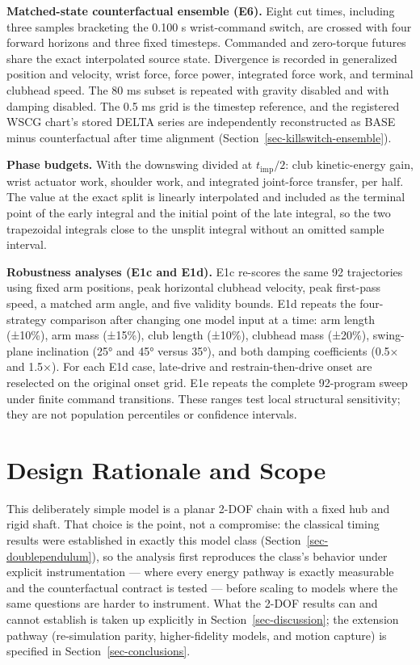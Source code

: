 \documentclass[
  letterpaper,
]{report}
\begin{document}
\textbf{Matched-state counterfactual ensemble (E6).} Eight cut times,
including three samples bracketing the 0.100 s wrist-command switch, are
crossed with four forward horizons and three fixed timesteps. Commanded
and zero-torque futures share the exact interpolated source state.
Divergence is recorded in generalized position and velocity, wrist
force, force power, integrated force work, and terminal clubhead speed.
The 80 ms subset is repeated with gravity disabled and with damping
disabled. The 0.5 ms grid is the timestep reference, and the registered
WSCG chart's stored DELTA series are independently reconstructed as BASE
minus counterfactual after time alignment
(Section~\ref{sec-killswitch-ensemble}).

\textbf{Phase budgets.} With the downswing divided at
\(t_{\mathrm{imp}}/2\): club kinetic-energy gain, wrist actuator work,
shoulder work, and integrated joint-force transfer, per half. The value
at the exact split is linearly interpolated and included as the terminal
point of the early integral and the initial point of the late integral,
so the two trapezoidal integrals close to the unsplit integral without
an omitted sample interval.

\textbf{Robustness analyses (E1c and E1d).} E1c re-scores the same 92
trajectories using fixed arm positions, peak horizontal clubhead
velocity, peak first-pass speed, a matched arm angle, and five validity
bounds. E1d repeats the four-strategy comparison after changing one
model input at a time: arm length (±10\%), arm mass (±15\%), club length
(±10\%), clubhead mass (±20\%), swing-plane inclination (25° and 45°
versus 35°), and both damping coefficients (0.5× and 1.5×). For each E1d
case, late-drive and restrain-then-drive onset are reselected on the
original onset grid. E1e repeats the complete 92-program sweep under
finite command transitions. These ranges test local structural
sensitivity; they are not population percentiles or confidence
intervals.

\section{Design Rationale and Scope}\label{sec-methods-scope}

This deliberately simple model is a planar 2-DOF chain with a fixed hub
and rigid shaft. That choice is the point, not a compromise: the
classical timing results were established in exactly this model class
(Section~\ref{sec-doublependulum}), so the analysis first reproduces the
class's behavior under explicit instrumentation --- where every energy
pathway is exactly measurable and the counterfactual contract is tested
--- before scaling to models where the same questions are harder to
instrument. What the 2-DOF results can and cannot establish is taken up
explicitly in Section~\ref{sec-discussion}; the extension pathway
(re-simulation parity, higher-fidelity models, and motion capture) is
specified in Section~\ref{sec-conclusions}.
\end{document}
